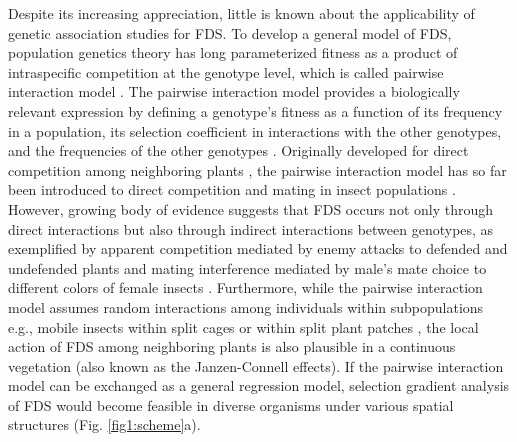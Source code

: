 \documentclass[12pt,]{article}
\begin{document}
Despite its increasing appreciation, little is known about the applicability of genetic association studies for FDS. To develop a general model of FDS, population genetics theory has long parameterized fitness as a product of intraspecific competition at the genotype level, which is called pairwise interaction model \citep{schutz1969inter, cockerham1972frequency, asmussen_frequency-dependent_1990, trotter2007frequency, schneider_maximization_2008}. The pairwise interaction model provides a biologically relevant expression by defining a genotype's fitness as a function of its frequency in a population, its selection coefficient in interactions with the other genotypes, and the frequencies of the other genotypes \citep{cockerham1972frequency, asmussen_frequency-dependent_1990,trotter2007frequency}. Originally developed for direct competition among neighboring plants \citep{schutz1969inter}, the pairwise interaction model has so far been introduced to direct competition and mating in insect populations \citep{alvarez2005models}. However, growing body of evidence suggests that FDS occurs not only through direct interactions but also through indirect interactions between genotypes, as exemplified by apparent competition mediated by enemy attacks to defended and undefended plants \citep{antonovics1984experimental, brunet2000disease, sato2017herbivore} and mating interference mediated by male's mate choice to different colors of female insects \citep{van2001frequency,takahashi2010negative}. Furthermore, while the pairwise interaction model assumes random interactions among individuals within subpopulations e.g., mobile insects within split cages \citep{cosmidis1999rarer,fitzpatrick2007maintaining} or within split plant patches \citep{sato2017herbivore}, the local action of FDS among neighboring plants is also plausible in a continuous vegetation \citep{janzen1970herbivores, connell1971role, browne2016frequency} (also known as the Janzen-Connell effects). If the pairwise interaction model can be exchanged as a general regression model, selection gradient analysis of FDS would become feasible in diverse organisms under various spatial structures (Fig. \ref{fig1:scheme}a).
\end{document}
